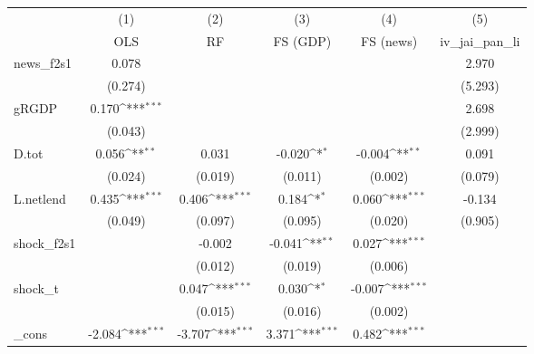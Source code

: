 {
\def\sym#1{\ifmmode^{#1}\else\(^{#1}\)\fi}
\begin{tabular}{l*{5}{c}}
\toprule
            &\multicolumn{1}{c}{(1)}&\multicolumn{1}{c}{(2)}&\multicolumn{1}{c}{(3)}&\multicolumn{1}{c}{(4)}&\multicolumn{1}{c}{(5)}\\
            &\multicolumn{1}{c}{OLS}&\multicolumn{1}{c}{RF}&\multicolumn{1}{c}{FS (GDP)}&\multicolumn{1}{c}{FS (news)}&\multicolumn{1}{c}{iv\_jai\_pan\_li}\\
\midrule
news\_f2s1   &       0.078         &                     &                     &                     &       2.970         \\
            &     (0.274)         &                     &                     &                     &     (5.293)         \\
\addlinespace
gRGDP       &       0.170\sym{***}&                     &                     &                     &       2.698         \\
            &     (0.043)         &                     &                     &                     &     (2.999)         \\
\addlinespace
D.tot       &       0.056\sym{**} &       0.031         &      -0.020\sym{*}  &      -0.004\sym{**} &       0.091         \\
            &     (0.024)         &     (0.019)         &     (0.011)         &     (0.002)         &     (0.079)         \\
\addlinespace
L.netlend   &       0.435\sym{***}&       0.406\sym{***}&       0.184\sym{*}  &       0.060\sym{***}&      -0.134         \\
            &     (0.049)         &     (0.097)         &     (0.095)         &     (0.020)         &     (0.905)         \\
\addlinespace
shock\_f2s1  &                     &      -0.002         &      -0.041\sym{**} &       0.027\sym{***}&                     \\
            &                     &     (0.012)         &     (0.019)         &     (0.006)         &                     \\
\addlinespace
shock\_t     &                     &       0.047\sym{***}&       0.030\sym{*}  &      -0.007\sym{***}&                     \\
            &                     &     (0.015)         &     (0.016)         &     (0.002)         &                     \\
\addlinespace
\_cons      &      -2.084\sym{***}&      -3.707\sym{***}&       3.371\sym{***}&       0.482\sym{***}&                     \\

\end{tabular}}
